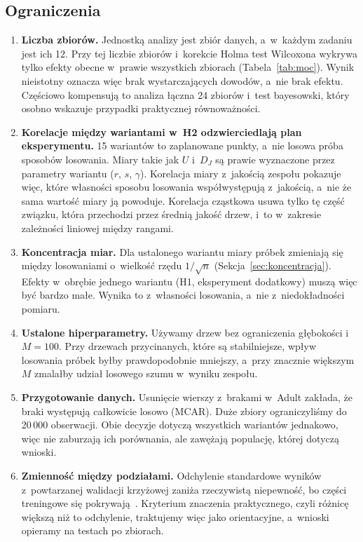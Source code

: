 \subsection{Ograniczenia}

\begin{enumerate}
  \item \textbf{Liczba zbiorów.} Jednostką analizy jest zbiór danych, a~w~każdym zadaniu jest ich 12. Przy tej liczbie zbiorów i~korekcie Holma test Wilcoxona wykrywa tylko efekty obecne w~prawie wszystkich zbiorach (Tabela~\ref{tab:moc}). Wynik nieistotny oznacza więc brak wystarczających dowodów, a~nie brak efektu. Częściowo kompensują to analiza łączna 24 zbiorów i~test bayesowski, który osobno wskazuje przypadki praktycznej równoważności.
  \item \textbf{Korelacje między wariantami w~H2 odzwierciedlają plan eksperymentu.} 15 wariantów to zaplanowane punkty, a~nie losowa próba sposobów losowania. Miary takie jak $U$ i~$D_J$ są prawie wyznaczone przez parametry wariantu ($r$, $s$, $\gamma$). Korelacja miary z~jakością zespołu pokazuje więc, które własności sposobu losowania współwystępują z~jakością, a~nie że sama wartość miary ją powoduje. Korelacja cząstkowa usuwa tylko tę część związku, która przechodzi przez średnią jakość drzew, i~to w~zakresie zależności liniowej między rangami.
  \item \textbf{Koncentracja miar.} Dla ustalonego wariantu miary próbek zmieniają się między losowaniami o~wielkość rzędu $1/\sqrt{n}$ (Sekcja~\ref{sec:koncentracja}). Efekty w~obrębie jednego wariantu (H1, eksperyment dodatkowy) muszą więc być bardzo małe. Wynika to z~własności losowania, a~nie z~niedokładności pomiaru.
  \item \textbf{Ustalone hiperparametry.} Używamy drzew bez ograniczenia głębokości i~$M=100$. Przy drzewach przycinanych, które są stabilniejsze, wpływ losowania próbek byłby prawdopodobnie mniejszy, a~przy znacznie większym $M$ zmalałby udział losowego szumu w~wyniku zespołu.
  \item \textbf{Przygotowanie danych.} Usunięcie wierszy z~brakami w~Adult zakłada, że braki występują całkowicie losowo (MCAR). Duże zbiory ograniczyliśmy do 20\,000 obserwacji. Obie decyzje dotyczą wszystkich wariantów jednakowo, więc nie zaburzają ich porównania, ale zawężają populację, której dotyczą wnioski.
  \item \textbf{Zmienność między podziałami.} Odchylenie standardowe wyników z~powtarzanej walidacji krzyżowej zaniża rzeczywistą niepewność, bo części treningowe się pokrywają~\cite{nadeau2003}. Kryterium znaczenia praktycznego, czyli różnicę większą niż to odchylenie, traktujemy więc jako orientacyjne, a~wnioski opieramy na testach po zbiorach.
\end{enumerate}
